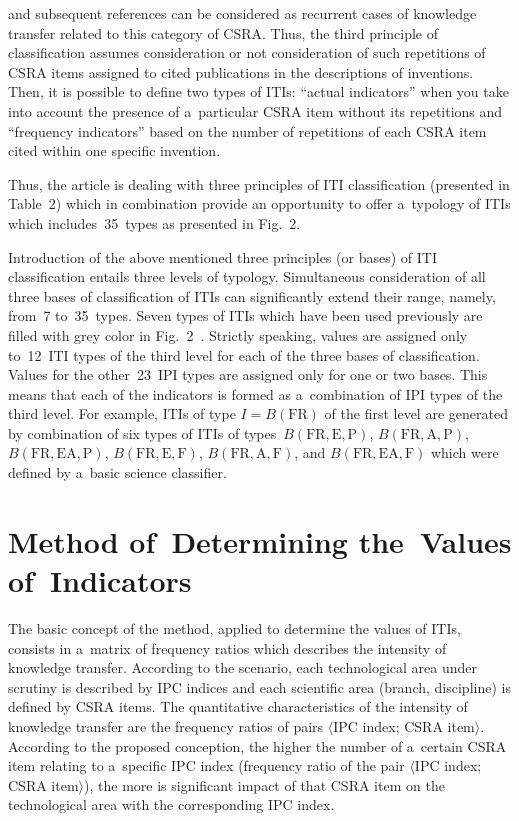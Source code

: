 \begin{multicols}{2}

\noindent
 and subsequent references can be considered as recurrent 
cases of knowledge transfer related to this category of CSRA. Thus, the third 
principle of classification assumes consideration or not consideration of such 
repetitions of CSRA items assigned to cited publications in the descriptions of 
inventions. Then, it is possible to define two types of ITIs: ``actual indicators'' when 
you take into account the presence of a~particular CSRA item without its repetitions 
and ``frequency indicators'' based on the number of repetitions of each CSRA item 
cited within one specific invention.
    
    Thus, the article is dealing with three principles of ITI classification (presented 
in Table~2) which in combination provide an opportunity to offer a~typology of ITIs 
which includes~35~types as presented in Fig.~2.
    
    
    
    Introduction of the above mentioned three principles (or bases) of ITI 
classification entails three levels of typology. Simultaneous consideration of all three 
bases of classification of ITIs can significantly extend their range, namely, from~7 
to~35~types. Seven types of ITIs which have been used previously are filled with 
grey color in Fig.~2~\cite{3-zat}. Strictly speaking, values are assigned only 
to~12~ITI types of the third level for each of the three bases of classification. Values 
for the other~23~IPI types are assigned only for one or two bases. This means that 
each of the indicators is formed as a~combination of IPI types of the third level. For 
example, ITIs of type $I = B(\mathrm{FR})$ of the first level are generated by combination of 
six types of ITIs of types~$B(\mathrm{FR, E, P})$, $B(\mathrm{FR, A, P})$, 
$B(\mathrm{FR, EA, P})$, $B(\mathrm{FR, E, 
F})$, $B(\mathrm{FR, A, F})$, and $B(\mathrm{FR, EA, F})$ which were defined by a~basic science 
classifier.



\section*{Method of~Determining the~Values of~Indicators}

\noindent
    The basic concept of the method, applied to determine the values of ITIs, 
consists in a~matrix of frequency ratios which describes the intensity of knowledge 
transfer. According to the scenario, each technological area under scrutiny is 
described by IPC indices and each scientific area (branch, discipline) is defined by 
CSRA items. The quantitative characteristics of the intensity of knowledge transfer 
are the frequency ratios of pairs $\langle$IPC index; CSRA item$\rangle$. According 
to the proposed conception, the higher the number of a~certain CSRA item relating to 
a~specific IPC index (frequency ratio of the pair $\langle$IPC index; CSRA 
item$\rangle$), the more is significant impact of that CSRA item on the technological 
area with the corresponding IPC index. 
    

\end{multicols}
